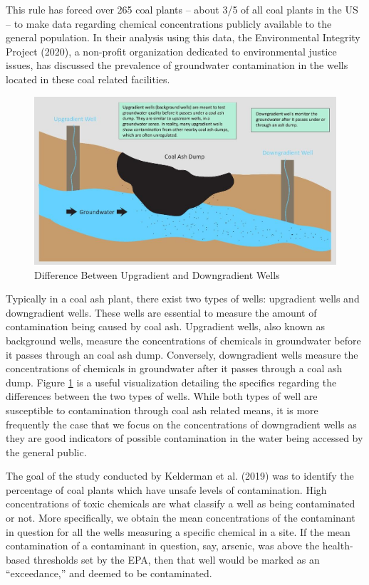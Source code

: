 \documentclass[12pt, twoside]{amherstthesis}
\begin{document}
This rule has forced over 265 coal plants -- about 3/5 of all coal plants in the US -- to make data regarding chemical concentrations publicly available to the general population. In their analysis using this data, the Environmental Integrity Project (2020), a non-profit organization dedicated to environmental justice issues, has discussed the prevalence of groundwater contamination in the wells located in these coal related facilities.
\begin{figure}

{\centering \includegraphics[width=1\linewidth]{figures/upgradientdowngradient} 

}

\caption{Difference Between Upgradient and Downgradient Wells}\label{fig:upgradientdowngradient}
\end{figure}
Typically in a coal ash plant, there exist two types of wells: upgradient wells and downgradient wells. These wells are essential to measure the amount of contamination being caused by coal ash. Upgradient wells, also known as background wells, measure the concentrations of chemicals in groundwater before it passes through an coal ash dump. Conversely, downgradient wells measure the concentrations of chemicals in groundwater after it passes through a coal ash dump. Figure \ref{fig:upgradientdowngradient} is a useful visualization detailing the specifics regarding the differences between the two types of wells. While both types of well are susceptible to contamination through coal ash related means, it is more frequently the case that we focus on the concentrations of downgradient wells as they are good indicators of possible contamination in the water being accessed by the general public.

The goal of the study conducted by Kelderman et al. (2019) was to identify the percentage of coal plants which have unsafe levels of contamination. High concentrations of toxic chemicals are what classify a well as being contaminated or not. More specifically, we obtain the mean concentrations of the contaminant in question for all the wells measuring a specific chemical in a site. If the mean contamination of a contaminant in question, say, arsenic, was above the health-based thresholds set by the EPA, then that well would be marked as an ``exceedance,'' and deemed to be contaminated.
\end{document}
